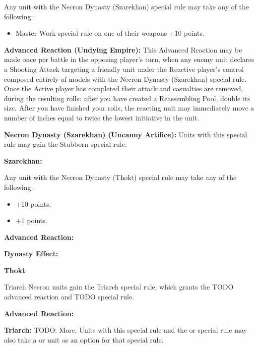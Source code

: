 Any unit with the Necron Dynasty (Szarekhan) special rule may take any of the following:
\begin{itemize}
	\item Master-Work special rule on one of their weapons \dotfill +10 points.
\end{itemize}

\textbf{Advanced Reaction (Undying Empire):} This Advanced Reaction may be made once per battle in the opposing player's turn, when any enemy unit declares a Shooting Attack targeting a friendly unit under the Reactive player's control composed entirely of models with the Necron Dynasty (Szarekhan) special rule. Once the Active player has completed their attack and casualties are removed, during the resulting  rolls: after you have created a Reassembling Pool, double its size. After you have finished your  rolls, the reacting unit may immediately move a number of inches equal to twice the lowest initiative in the unit.

\textbf{Necron Dynasty (Szarekhan) (Uncanny Artifice):} Units with this special rule may gain the Stubborn special rule. %

\textbf{Szarekhan:}


\newpage
{}

Any unit with the Necron Dynasty (Thokt) special rule may take any of the following:
\begin{itemize}
	\item {} \dotfill +10 points.
	\item {} \dotfill +1 points.
\end{itemize}

\textbf{Advanced Reaction:}

\textbf{Dynasty Effect:} 

\textbf{Thokt}


\newpage
{}

Triarch Necron units gain the Triarch special rule, which grants the TODO advanced reaction and TODO special rule.

\textbf{Advanced Reaction:}

\textbf{Triarch:} TODO: More. Units with this special rule and the  or  special rule may also take a  or  unit as an option for that special rule.

